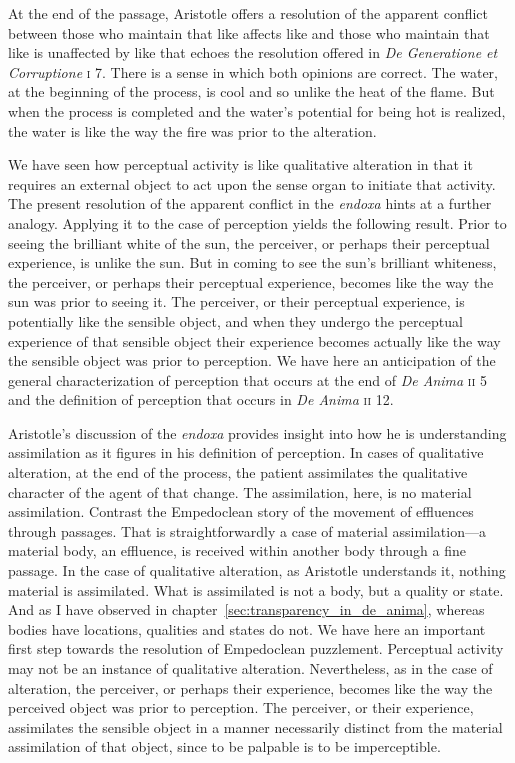At the end of the passage, Aristotle offers a resolution of the apparent conflict between those who maintain that like affects like and those who maintain that like is unaffected by like that echoes the resolution offered in \emph{De Generatione et Corruptione} \textsc{i} 7. There is a sense in which both opinions are correct. The water, at the beginning of the process, is cool and so unlike the heat of the flame. But when the process is completed and the water's potential for being hot is realized, the water is like the way the fire was prior to the alteration. 

We have seen how perceptual activity is like qualitative alteration in that it requires an external object to act upon the sense organ to initiate that activity. The present resolution of the apparent conflict in the \emph{endoxa} hints at a further analogy. Applying it to the case of perception yields the following result. Prior to seeing the brilliant white of the sun, the perceiver, or perhaps their perceptual experience, is unlike the sun. But in coming to see the sun's brilliant whiteness, the perceiver, or perhaps their perceptual experience, becomes like the way the sun was prior to seeing it. The perceiver, or their perceptual experience, is potentially like the sensible object, and when they undergo the perceptual experience of that sensible object their experience becomes actually like the way the sensible object was prior to perception. We have here an anticipation of the general characterization of perception that occurs at the end of \emph{De Anima} \textsc{ii} 5 and the definition of perception that occurs in \emph{De Anima} \textsc{ii} 12.

Aristotle's discussion of the \emph{endoxa} provides insight into how he is understanding assimilation as it figures in his definition of perception. In cases of qualitative alteration, at the end of the process, the patient assimilates the qualitative character of the agent of that change. The assimilation, here, is no material assimilation. Contrast the Empedoclean story of the movement of effluences through passages. That is straightforwardly a case of material assimilation---a material body, an effluence, is received within another body through a fine passage. In the case of qualitative alteration, as Aristotle understands it, nothing material is assimilated. What is assimilated is not a body, but a quality or state. And as I have observed in chapter~\ref{sec:transparency_in_de_anima}, whereas bodies have locations, qualities and states do not. We have here an important first step towards the resolution of Empedoclean puzzlement. Perceptual activity may not be an instance of qualitative alteration. Nevertheless, as in the case of alteration, the perceiver, or perhaps their experience, becomes like the way the perceived object was prior to perception. The perceiver, or their experience, assimilates the sensible object in a manner necessarily distinct from the material assimilation of that object, since to be palpable is to be imperceptible.

